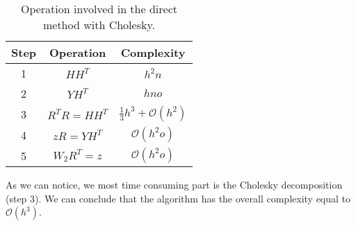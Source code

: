 \begingroup
    \renewcommand{\arraystretch}{2} %
    \begin{table}
        \begin{center}
            \begin{tabular}{ |c|c|c| } 
                \hline
                \textbf{Step} & \textbf{Operation} & \textbf{Complexity} \\ 
                \hline\hline
                1 & $HH^T$ & $h^2n$ \\ 
                \hline
                2 & $YH^T$ & $hno$ \\ 
                \hline
                3 & $R^TR = HH^T$ & $\frac{1}{3}h^3 + \mathcal{O}(h^2)$ \\ 
                \hline
                4 &$zR = YH^T$ & $\mathcal{O}(h^2o)$ \\ 
                \hline
                5 & $W_2R^T = z$ & $\mathcal{O}(h^2o)$ \\ 
                \hline
            \end{tabular}
            \caption{Operation involved in the direct method with Cholesky.}
            \label{table:complexity}
        \end{center}
    \end{table}
\endgroup
As we can notice, we most time consuming part is the Cholesky decomposition (step 3). We can conclude that the algorithm has the overall complexity equal to $\mathcal{O}(h^3)$.